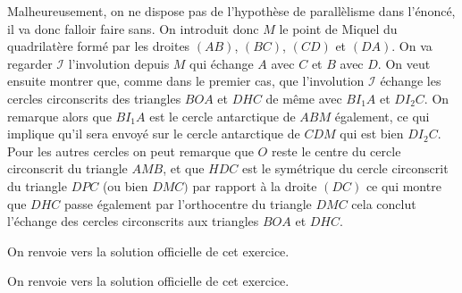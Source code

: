\begin{sol}
Malheureusement, on ne dispose pas de l'hypothèse de parallèlisme dans l'énoncé, il va donc falloir faire sans. On introduit donc $M$ le point de Miquel du quadrilatère formé par les droites $(AB)$, $(BC)$, $(CD)$ et $(DA)$. On va regarder $\mathcal{I}$ l'involution depuis $M$ qui échange $A$ avec $C$ et $B$ avec $D$. On veut ensuite montrer que, comme dans le premier cas, que l'involution $\mathcal{I}$ échange les cercles circonscrits des triangles $BOA$ et $DHC$ de même avec $BI_1A$ et $DI_2C$. On remarque alors que $BI_1A$ est le cercle antarctique de $ABM$ également, ce qui implique qu'il sera envoyé sur le cercle antarctique de $CDM$ qui est bien $DI_2C$. Pour les autres cercles on peut remarque que $O$ reste le centre du cercle circonscrit du triangle $AMB$, et que $HDC$ est le symétrique du cercle circonscrit du triangle $DPC$ (ou bien $DMC)$ par rapport à la droite $(DC)$ ce qui montre que $DHC$ passe également par l'orthocentre du triangle $DMC$ cela conclut l'échange des cercles circonscrits aux triangles $BOA$ et $DHC$.

\end{sol}


\begin{sol}

On renvoie vers la solution officielle de cet exercice.
\end{sol}

\begin{sol}

On renvoie vers la solution officielle de cet exercice.
\end{sol}
